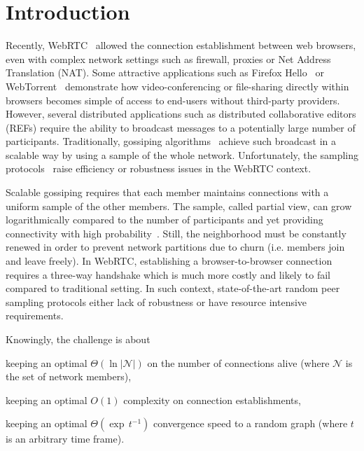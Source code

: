 
\section{Introduction}

Recently, WebRTC~\cite{webrtc} allowed the connection establishment between web
browsers, even with complex network settings such as firewall, proxies or Net
Address Translation (NAT).  Some attractive applications such as Firefox
Hello~\cite{firefoxhello} or WebTorrent~\cite{webtorrent} demonstrate how
video-conferencing or file-sharing directly within browsers becomes simple of
access to end-users without third-party providers. However, several distributed
applications such as distributed collaborative editors (REFs) require the
ability to broadcast messages to a potentially large number of
participants. Traditionally, gossiping algorithms~\cite{eugster2003lightweight,
  tolgyeski2009adaptive} achieve such broadcast in a scalable way by using a
sample of the whole network. Unfortunately, the sampling
protocols~\cite{eugster2003lightweight, tolgyeski2009adaptive, ganesh2003peer,
  jelasity2004peer, voulgaris2005cyclon} raise efficiency or robustness
issues in the WebRTC context.

Scalable gossiping requires that each member maintains connections with a
uniform sample of the other members. The sample, called partial view, can grow
logarithmically compared to the number of participants and yet providing
connectivity with high probability~\cite{erdos1959random}. Still, the
neighborhood must be constantly renewed in order to prevent network partitions
due to churn (i.e. members join and leave freely). In WebRTC, establishing a
browser-to-browser connection requires a three-way handshake which is much more
costly and likely to fail compared to traditional setting. In such context,
state-of-the-art random peer sampling protocols either lack of robustness or
have resource intensive requirements.

Knowingly, the challenge is about
\begin{inparaenum}[(i)]
\item keeping an optimal $\Theta(\ln |\mathcal{N}|)$ on the number of
  connections alive\cite{erdos1959random} (where $\mathcal{N}$ is the set of
  network members),
\item keeping an optimal $O(1)$ complexity on connection establishments,
\item keeping an optimal $\Theta(\exp \, t^{-1})$ convergence speed to a random
  graph (where $t$ is an arbitrary time frame).
\end{inparaenum}

